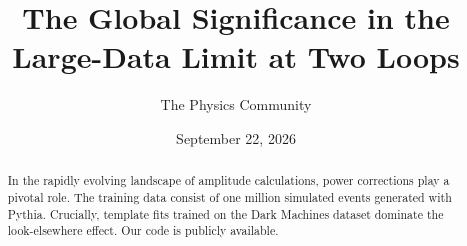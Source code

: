\documentclass[11pt]{article}
\title{The Global Significance in the Large-Data Limit at Two Loops}
\author{The Physics Community}
\date{September 22, 2026}
\begin{document}
\maketitle
\begin{abstract}
In the rapidly evolving landscape of amplitude calculations, power
corrections play a pivotal role. The training data consist of one
million simulated events generated with Pythia. Crucially, template fits
trained on the Dark Machines dataset dominate the look-elsewhere effect.
Our code is publicly available.
\end{abstract}
\tableofcontents





\nocite{*}


\end{document}

